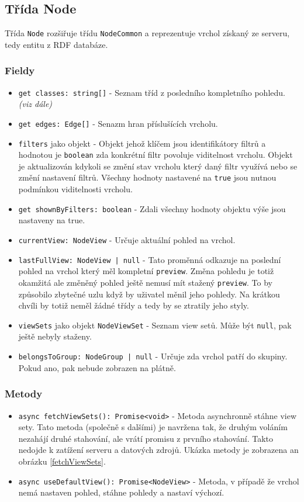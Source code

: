 \subsection{Třída Node}
Třída \texttt{Node} rozšiřuje třídu \texttt{NodeCommon} a reprezentuje vrchol získaný ze serveru, tedy entitu z RDF databáze.

\subsubsection*{Fieldy}
\begin{itemize}
  \item \texttt{get classes: string[]} - Seznam tříd z posledního kompletního pohledu. \textit{(viz dále)}
  \item \texttt{get edges: Edge[]} - Senazm hran příslušících vrcholu.
  \item \texttt{filters} jako objekt - Objekt jehož klíčem jsou identifikátory filtrů a hodnotou je \texttt{boolean} zda konkrétní filtr povoluje viditelnost vrcholu. Objekt je aktualizován kdykoli se změní stav vrcholu který daný filtr využívá nebo se změní nastavení filtrů. Všechny hodnoty nastavené na \texttt{true} jsou nutnou podmínkou viditelnosti vrcholu.
  \item \texttt{get shownByFilters: boolean} - Zdali všechny hodnoty objektu výše jsou nastaveny na true.
  \item \texttt{currentView: NodeView} - Určuje aktuální pohled na vrchol.
  \item \texttt{lastFullView: NodeView | null} - Tato proměnná odkazuje na poslední pohled na vrchol který měl kompletní \texttt{preview}. Změna pohledu je totiž okamžitá ale změněný pohled ještě nemusí mít stažený \texttt{preview}. To by způsobilo zbytečné  uzlu když by uživatel měnil jeho pohledy. Na krátkou chvíli by totiž neměl žádné třídy a tedy by se ztratily jeho styly.
  \item \texttt{viewSets} jako objekt \texttt{NodeViewSet} - Seznam view setů. Může být \texttt{null}, pak ještě nebyly staženy.
  \item \texttt{belongsToGroup: NodeGroup | null} - Určuje zda vrchol patří do skupiny. Pokud ano, pak nebude zobrazen na plátně.
\end{itemize}


\subsubsection*{Metody}
\begin{itemize}
  \item \texttt{async fetchViewSets(): Promise<void>} - Metoda asynchronně stáhne view sety. Tato metoda (společně s dalšími) je navržena tak, že druhým voláním nezahájí druhé stahování, ale vrátí promisu z prvního stahování. Takto nedojde k zatížení serveru a datových zdrojů. Ukázka metody je zobrazena an obrázku \ref{fetchViewSets}.
  \item \texttt{async useDefaultView(): Promise<NodeView>} - Metoda, v případě že vrchol nemá nastaven pohled, stáhne pohledy a nastaví výchozí.
\end{itemize}

